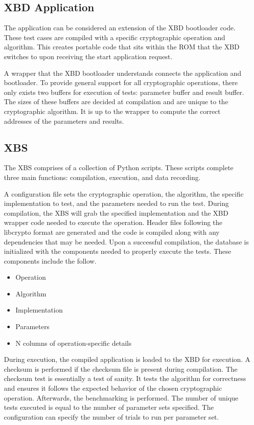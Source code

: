 \documentclass[10pt]{article}
\begin{document}
\subsection{XBD Application}
The application can be considered an extension of the XBD bootloader code. These test 
cases are compiled with a specific cryptographic operation and algorithm. This creates 
portable code that sits within the ROM that the XBD switches to upon receiving the start 
application request.

A wrapper that the XBD bootloader understands connects the application and bootloader. 
To provide general support for all cryptographic operations, there only exists two buffers 
for execution of tests: parameter buffer and result buffer. The sizes of these buffers 
are decided at compilation and are unique to the cryptographic algorithm. It is up to the 
wrapper to compute the correct addresses of the parameters and results.

\subsection{XBS}
The XBS comprises of a collection of Python scripts. These scripts complete three main 
functions: compilation, execution, and data recording. 

A configuration file sets the cryptographic operation, the algorithm, the specific 
implementation to test, and the parameters needed to run the test. During compilation, 
the XBS will grab the specified implementation and the XBD wrapper code needed to execute 
the operation. Header files following the libcrypto format are generated and the code 
is compiled along with any dependencies that may be needed.
Upon a successful compilation, the database is initialized with the components needed 
to properly execute the tests. These components include the follow.

\begin{itemize}
  \item Operation
  \item Algorithm
  \item Implementation
  \item Parameters
  \item N columns of operation-specific details
\end{itemize}

During execution, the compiled application is loaded to the XBD for execution. 
A checksum is performed if the checksum file is present during compilation. The checksum 
test is essentially a test of sanity. It tests the algorithm for correctness and ensures 
it follows the expected behavior of the chosen cryptographic operation. Afterwards, the 
benchmarking is performed. The number of unique tests executed is equal to the number of 
parameter sets specified. The configuration can specify the number of trials to run per 
parameter set.
\end{document}
